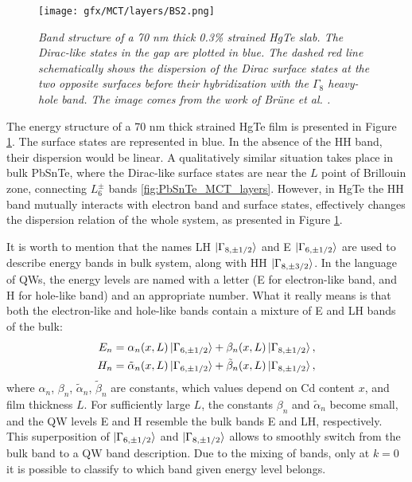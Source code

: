 \documentclass[titlepage,a4paper]{book}
\begin{document}
\begin{figure}[ht]
	\centering
	\texttt{[image: gfx/MCT/layers/BS2.png]}
	\vspace{-10pt}
	\caption{\textit{Band structure of a 70 nm thick 0.3\% strained HgTe slab. The Dirac-like states in the gap are plotted in blue. The dashed red line schematically shows the dispersion of the Dirac surface states at the two opposite surfaces before their hybridization with the $\Gamma_8$ heavy-hole band. The image comes from the work of Brüne \textit{et al.} \cite{Brune_State2}.}}
	\label{fig:BS_MCT_layers}
\end{figure} 

The energy structure of a 70 nm thick strained HgTe film is presented in Figure \ref{fig:BS_MCT_layers}. The surface states are represented in blue. In the absence of the HH band, their dispersion would be linear. A qualitatively similar situation takes place in bulk PbSnTe, where the Dirac-like surface states are near the $L$ point of Brillouin zone, connecting $L_6^{\pm}$ bands \ref{fig:PbSnTe_MCT_layers}. However, in HgTe the HH band mutually interacts with electron band and surface states, effectively changes the dispersion relation of the whole system, as presented in Figure \ref{fig:BS_MCT_layers}. 

It is worth to mention that the names LH $\ket{\Gamma_{8, \pm 1/2}}$ and E $\ket{\Gamma_{6, \pm 1/2}}$ are used to describe energy bands in bulk system, along with HH $\ket{\Gamma_{8, \pm 3/2}}$. In the language of QWs, the energy levels are named with a letter (E for electron-like band, and H for hole-like band) and an appropriate number. What it really means is that both the electron-like and hole-like bands contain a mixture of E and LH bands of the bulk:
\begin{equation}
\label{MCT_layers_levels}
\begin{aligned}
E_n = \alpha_n(x, L) \ket{\Gamma_{6, \pm 1/2}}+\beta_n(x, L) \ket{\Gamma_{8, \pm 1/2}},\\
H_n = \tilde{\alpha}_n(x, L) \ket{\Gamma_{6, \pm 1/2}}+\tilde{\beta}_n(x, L) \ket{\Gamma_{8, \pm 1/2}},
\end{aligned}
\end{equation}
where $\alpha_n$, $\beta_n$, $\tilde{\alpha}_n$, $\tilde{\beta}_n$ are constants, which values depend on Cd content $x$, and film thickness $L$. For sufficiently large $L$, the constants $\beta_n$ and $\tilde{\alpha}_n$ become small, and the QW levels E and H resemble the bulk bands E and LH, respectively. This superposition of $\ket{\Gamma_{6, \pm 1/2}}$ and $\ket{\Gamma_{8, \pm 1/2}}$ allows to smoothly switch from the bulk band to a QW band description. Due to the mixing of bands, only at $k = 0$ it is possible to classify to which band given energy level belongs.
\end{document}
